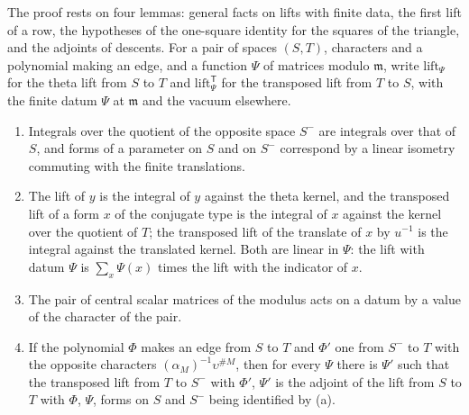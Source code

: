 The proof rests on four lemmas: general facts on lifts with finite data, the first lift of a row, the hypotheses of the one-square identity for the squares of the triangle, and the adjoints of descents.
For a pair of spaces $(S,T)$, characters and a polynomial making an edge, and a function $\Psi$ of matrices modulo $\mathfrak m$, write $\mathrm{lift}_\Psi$ for the theta lift from $S$ to $T$ and $\mathrm{lift}^{\mathsf T}_\Psi$ for the
transposed lift from $T$ to $S$, with the finite datum $\Psi$ at $\mathfrak m$ and the vacuum elsewhere.

\begin{lemma}\label{lem:mod-lifts}
\begin{enumerate}[label=\textup{(\alph*)}]
\item Integrals over the quotient of the opposite space $S^-$ are integrals over that of $S$, and forms of a parameter on $S$ and on $S^-$ correspond by a linear isometry commuting with the finite translations.
\item The lift of $y$ is the integral of $y$ against the theta kernel, and the transposed lift of a form $x$ of the conjugate type is the integral of $x$ against the kernel over the quotient of $T$; the transposed
lift of the translate of $x$ by $u^{-1}$ is the integral against the translated kernel. Both are linear in $\Psi$: the lift with datum $\Psi$ is $\sum_x\Psi(x)$ times the lift with the indicator of $x$.
\item The pair of central scalar matrices of the modulus acts on a datum by a value of the character of the pair.
\item If the polynomial $\Phi$ makes an edge from $S$ to $T$ and $\Phi'$ one from $S^-$ to $T$ with the opposite characters $(\alpha_M)^{-1}\upsilon^{\#M}$, then for every $\Psi$ there is $\Psi'$ such that the transposed lift from $T$ to $S^-$
with $\Phi'$, $\Psi'$ is the adjoint of the lift from $S$ to $T$ with $\Phi$, $\Psi$, forms on $S$ and $S^-$ being identified by (a).
\end{enumerate}
\end{lemma}


